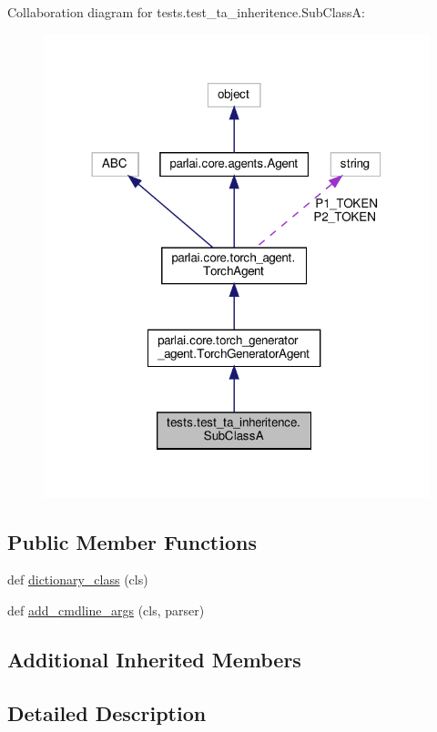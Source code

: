 Collaboration diagram for tests.\+test\+\_\+ta\+\_\+inheritence.\+Sub\+ClassA\+:
\nopagebreak
\begin{figure}[H]
\begin{center}
\leavevmode
\includegraphics[width=318pt]{classtests_1_1test__ta__inheritence_1_1SubClassA__coll__graph}
\end{center}
\end{figure}
\subsection*{Public Member Functions}
\begin{DoxyCompactItemize}
\item 
def \hyperlink{classtests_1_1test__ta__inheritence_1_1SubClassA_aa01b5f43121b539c377b9b1d50f93d0c}{dictionary\+\_\+class} (cls)
\item 
def \hyperlink{classtests_1_1test__ta__inheritence_1_1SubClassA_a088369e91c8005b70d20f17032998215}{add\+\_\+cmdline\+\_\+args} (cls, parser)
\end{DoxyCompactItemize}
\subsection*{Additional Inherited Members}


\subsection{Detailed Description}


